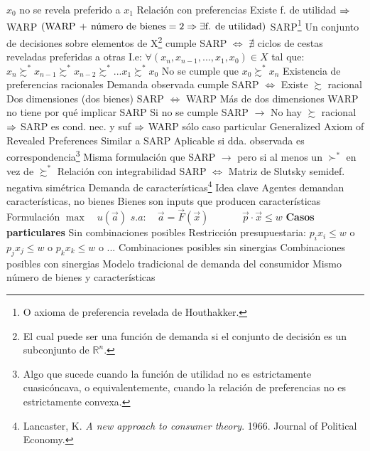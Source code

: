 \documentclass{nuevotema}
\begin{document}
\begin{esquemal}
				\4[] $x_0$ no se revela preferido a $x_1$
				\4 {Relación con preferencias}
				\4[] Existe f. de utilidad $\Rightarrow$ WARP
				\4[] $\left( \text{WARP} \, + \, \text{número de bienes}=2 \Rightarrow \exists \text{f. de utilidad} \right)$
			\3 SARP\footnote{O axioma de preferencia revelada de Houthakker.}
				\4 Un conjunto de decisiones sobre elementos de X\footnote{El cual puede ser una función de demanda si el conjunto de decisión es un subconjunto de $\mathbb{R}^n$.}
				\4 cumple SARP $\iff$
				\4[] $\nexists$ ciclos de cestas reveladas preferidas a otras
				\4[] I.e: $\forall (x_n, x_{n-1}, ..., x_1, x_0) \in X$ tal que:
				\4[] $x_n \succsim^* x_{n-1} \succsim^* x_{n-2} \succsim^* ... x_1 \succsim^* x_0$
				\4[] No se cumple que $x_0 \succsim^* x_n$
				\4 Existencia de preferencias racionales
				\4[] Demanda observada cumple SARP $\iff$
				\4[] Existe $\succsim$ racional
				\4 Dos dimensiones (dos bienes)
				\4[] SARP $\iff$ WARP
				\4 Más de dos dimensiones
				\4[] WARP no tiene por qué implicar SARP
				\4[] Si no se cumple SARP
				\4[] $\to$ No hay $\succsim$ racional
				\4[] $\Rightarrow$ SARP es cond. nec. y suf
				\4[] $\Rightarrow$ WARP sólo caso particular
			\3 Generalized Axiom of Revealed Preferences
				\4 Similar a SARP
				\4 Aplicable si dda. observada es correspondencia\footnote{Algo que sucede cuando la función de utilidad no es estrictamente cuasicóncava, o equivalentemente, cuando la relación de preferencias no es estrictamente convexa.}
				\4 Misma formulación que SARP
				\4[] $\to$ pero si al menos un $\succ^*$ en vez de $\succsim^*$
			\3 Relación con integrabilidad
				\4 SARP $\iff$ Matriz de Slutsky semidef. negativa simétrica
		\2 Demanda de características\footnote{Lancaster, K. \textit{A new approach to consumer theory}. 1966. Journal of Political Economy.}
			\3 Idea clave
				\4 Agentes demandan características, no bienes
				\4 Bienes son inputs que producen características
			\3 Formulación
				\4 $\max \quad u(\vec{a})$
				\4 $s.a: \quad \vec{a} =  \vec{F}(\vec{x})$
				\4 $\quad \quad \quad \vec{p} \cdot \vec{x} \leq w$
				\4 \textbf{Casos particulares}
				\4[(i)] Sin combinaciones posibles
				\4[$\to$] Restricción presupuestaria:
				\4[] $p_i x_i \leq w$ o $p_j x_j \leq w$ o $p_k x_k \leq w$ o ...
				\4[] 
				\4[(ii)] Combinaciones posibles sin sinergias
				\4[] 
				\4[(iii)] Combinaciones posibles con sinergias
				\4[] 
				\4[(iv)] Modelo tradicional de demanda del consumidor
				\4[$\to$] Mismo número de bienes y características

\end{esquemal}
\end{document}
